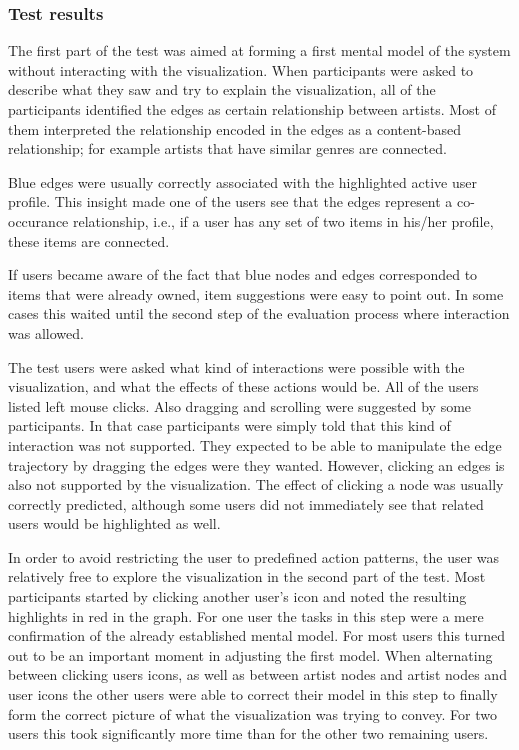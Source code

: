 \subsubsection{Test results}\label{chapter:prototype:section:paper:results}

The first part of the test was aimed at forming a first mental model of the system without interacting with the visualization. When participants were asked to describe what they saw and try to explain the visualization, all of the participants identified the edges as certain relationship between artists. Most of them interpreted the relationship encoded in the edges as a content-based relationship; for example artists that have similar genres are connected.

Blue edges were usually correctly associated with the highlighted active user profile. This insight made one of the users see that the edges represent a co-occurance relationship, i.e., if a user has any set of two items in his/her profile, these items are connected.

If users became aware of the fact that blue nodes and edges corresponded to items that were already owned, item suggestions were easy to point out. In some cases this waited until the second step of the evaluation process where interaction was allowed.

The test users were asked what kind of interactions were possible with the visualization, and what the effects of these actions would be. All of the users listed left mouse clicks. Also dragging and scrolling were suggested by some participants. In that case participants were simply told that this kind of interaction was not supported. They expected to be able to manipulate the edge trajectory by dragging the edges were they wanted. However, clicking an edges is also not supported by the visualization. The effect of clicking a node was usually correctly predicted, although some users did not immediately see that related users would be highlighted as well.

In order to avoid restricting the user to predefined action patterns, the user was relatively free to explore the visualization in the second part of the test. Most participants started by clicking another user's icon and noted the resulting highlights in red in the graph. For one user the tasks in this step were a mere confirmation of the already established mental model. For most users this turned out to be an important moment in adjusting the first model. When alternating between clicking users icons, as well as between artist nodes and artist nodes and user icons the other users were able to correct their model in this step to finally form the correct picture of what the visualization was trying to convey. For two users this took significantly more time than for the other two remaining users.

